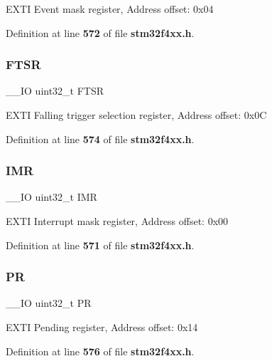 E\+X\+TI Event mask register, Address offset\+: 0x04 

Definition at line \textbf{ 572} of file \textbf{ stm32f4xx.\+h}.

\mbox{\label{structEXTI__TypeDef_aa0f7c828c46ae6f6bc9f66f11720bbe6}} 
\subsubsection{F\+T\+SR}
{\footnotesize\ttfamily \+\_\+\+\_\+\+IO uint32\+\_\+t F\+T\+SR}

E\+X\+TI Falling trigger selection register, Address offset\+: 0x0C 

Definition at line \textbf{ 574} of file \textbf{ stm32f4xx.\+h}.

\mbox{\label{structEXTI__TypeDef_ae845b86e973b4bf8a33c447c261633f6}} 
\subsubsection{I\+MR}
{\footnotesize\ttfamily \+\_\+\+\_\+\+IO uint32\+\_\+t I\+MR}

E\+X\+TI Interrupt mask register, Address offset\+: 0x00 

Definition at line \textbf{ 571} of file \textbf{ stm32f4xx.\+h}.

\mbox{\label{structEXTI__TypeDef_af8d25514079514d38c104402f46470af}} 
\subsubsection{PR}
{\footnotesize\ttfamily \+\_\+\+\_\+\+IO uint32\+\_\+t PR}

E\+X\+TI Pending register, Address offset\+: 0x14 

Definition at line \textbf{ 576} of file \textbf{ stm32f4xx.\+h}.

\mbox{\label{structEXTI__TypeDef_a0d952a17455687d6e9053730d028fa1d}} 
